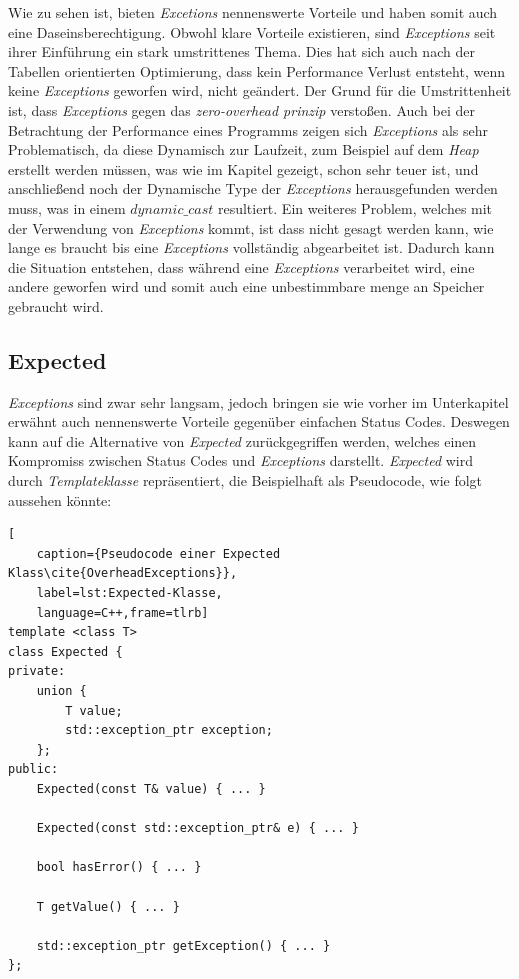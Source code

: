 Wie zu sehen ist, bieten \emph{Excetions} nennenswerte Vorteile und haben somit auch eine
Daseinsberechtigung.
\newline
\newline
Obwohl klare Vorteile existieren, sind \emph{Exceptions} seit ihrer Einführung ein stark
umstrittenes Thema. Dies hat sich auch nach der Tabellen orientierten Optimierung, dass kein
Performance Verlust entsteht, wenn keine \emph{Exceptions} geworfen wird, nicht geändert. Der
Grund für die Umstrittenheit ist, dass \emph{Exceptions} gegen das \emph{zero-overhead prinzip}
verstoßen. Auch bei der Betrachtung der Performance eines Programms zeigen sich \emph{Exceptions}
als sehr Problematisch, da diese Dynamisch zur Laufzeit, zum Beispiel auf dem \emph{Heap}
erstellt werden müssen, was wie im Kapitel \emph{} gezeigt, schon sehr teuer ist, und
anschließend noch der Dynamische Type der \emph{Exceptions} herausgefunden werden muss, was in
einem \emph{$dynamic\_cast$} resultiert. Ein weiteres Problem, welches mit der Verwendung von
\emph{Exceptions} kommt, ist dass nicht gesagt werden kann, wie lange es braucht bis eine
\emph{Exceptions} vollständig abgearbeitet ist. Dadurch kann die Situation entstehen, dass
während eine \emph{Exceptions} verarbeitet wird, eine andere geworfen wird und somit auch eine
unbestimmbare menge an Speicher gebraucht wird.\cite{HandsOn}

\subsection{Expected}
\emph{Exceptions} sind zwar sehr langsam, jedoch bringen sie wie vorher im Unterkapitel
\emph{} erwähnt auch nennenswerte Vorteile gegenüber einfachen Status Codes. Deswegen
kann auf die Alternative von \emph{Expected} zurückgegriffen werden, welches einen Kompromiss
zwischen Status Codes und \emph{Exceptions} darstellt. \emph{Expected} wird durch
\emph{Templateklasse} repräsentiert, die Beispielhaft als Pseudocode, wie folgt aussehen könnte:

\begin{lstlisting}[
    caption={Pseudocode einer Expected Klass\cite{OverheadExceptions}},
    label=lst:Expected-Klasse,
    language=C++,frame=tlrb]
template <class T>
class Expected {
private:
    union {
        T value;
        std::exception_ptr exception;
    };
public:
    Expected(const T& value) { ... }
    
    Expected(const std::exception_ptr& e) { ... }
    
    bool hasError() { ... }
    
    T getValue() { ... }
    
    std::exception_ptr getException() { ... }
};
\end{lstlisting}

